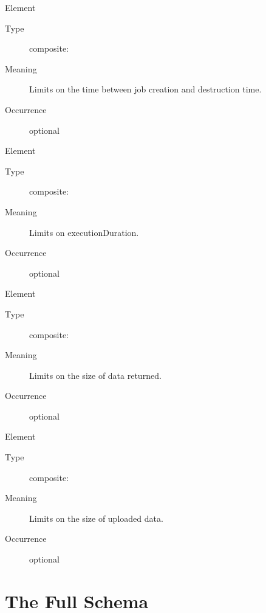 \documentclass{ivoa}
\begin{document}
\begin{bigdescription}
\begin{description}
\end{description}
\item[Element \xmlel{retentionPeriod}]
\begin{description}
\item[Type] composite: 
\item[Meaning] 
              Limits on the time between job creation and
              destruction time.
              
\item[Occurrence] optional

\end{description}
\item[Element \xmlel{executionDuration}]
\begin{description}
\item[Type] composite: 
\item[Meaning] 
              Limits on executionDuration.
              
\item[Occurrence] optional

\end{description}
\item[Element \xmlel{outputLimit}]
\begin{description}
\item[Type] composite: 
\item[Meaning] 
              Limits on the size of data returned.
              
\item[Occurrence] optional

\end{description}
\item[Element \xmlel{uploadLimit}]
\begin{description}
\item[Type] composite: 
\item[Meaning] 
              Limits on the size of uploaded data.
              
\item[Occurrence] optional

\end{description}


\end{bigdescription}\endgroup

\endgroup

\appendix


\section{The Full Schema}
\end{document}
